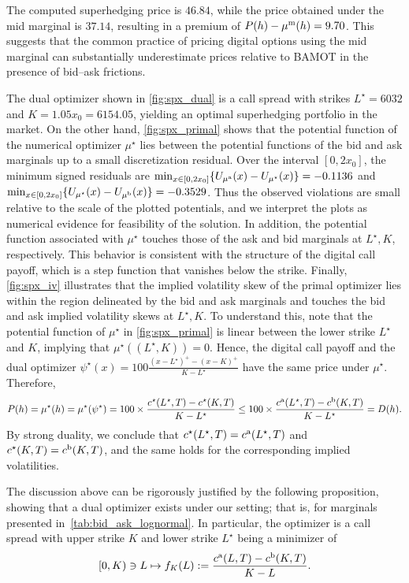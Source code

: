 \documentclass[11pt]{article}
\theoremstyle{plain}
\theoremstyle{definition}
\theoremstyle{remark}
\theoremstyle{plain}
\begin{document}
The computed superhedging price is $46.84$, while the price obtained under the mid marginal is $37.14$, resulting in a premium of $P(h)-\mu^{\rm m}(h)=9.70$. This suggests that the common practice of pricing digital options using the mid marginal can substantially underestimate prices relative to BAMOT in the presence of bid--ask frictions. 


The dual optimizer shown in \cref{fig:spx_dual} is a call spread with strikes $L^\star= 6032$ and $K = 1.05 x_0 = 6154.05$, yielding an optimal superhedging portfolio in the market. 
%
On the other hand, \cref{fig:spx_primal} shows that the potential function of the numerical optimizer $\mu^\star$ lies between the potential functions of the bid and ask marginals up to a small discretization residual. Over the interval $[0,2x_0]$, the minimum signed residuals are $\min_{x\in[0,2x_0]}
\{U_{\mu^{\rm a}}(x)-U_{\mu^\star}(x)\}
= -0.1136$ and $\min_{x\in[0,2x_0]}
\{U_{\mu^\star}(x)-U_{\mu^{\rm b}}(x)\}
= -0.3529$.
Thus the observed violations are small relative to the scale of the plotted potentials, and we interpret the plots as numerical evidence for feasibility of the solution.
In addition, the potential function associated with $\mu^{\star}$ touches those of the ask and bid marginals at $L^\star, K$, respectively. This behavior is consistent with the structure of the digital call payoff, which is a step function that vanishes below the strike. Finally, \cref{fig:spx_iv} illustrates that the implied volatility skew of the primal optimizer lies within the region delineated by the bid and ask marginals and touches the bid and ask implied volatility skews at $L^\star, K$.
To understand this, note that the potential function of $\mu^{\star}$ in \cref{fig:spx_primal} is linear between the lower strike $L^{\star}$ and $K$, implying that $\mu^{\star}((L^{\star},K))=0$. Hence, the digital call payoff and the dual optimizer $\psi^{\star}(x)=100\frac{(x-L^{\star})^+-(x-K)^+}{K-L^{\star}}$ have the same price under $\mu^{\star}$. Therefore,
\[
P(h)=\mu^{\star}(h)=\mu^{\star}(\psi^{\star})
=100\times\frac{c^{\star}(L^{\star},T)-c^{\star}(K,T)}{K-L^{\star}}
\le 100\times\frac{c^{\rm a}(L^{\star},T)-c^{\rm b}(K,T)}{K-L^{\star}}
= D(h).
\]
By strong duality, we conclude that $c^{\star}(L^{\star},T)=c^{\rm a}(L^{\star},T)$ and $c^{\star}(K,T)=c^{\rm b}(K,T)$, and the same holds for the corresponding implied volatilities.



%
%
The discussion above can be rigorously justified by the following proposition, showing that a dual optimizer exists under our setting; that is, for marginals presented in~\cref{tab:bid_ask_lognormal}. In particular, the optimizer is a call spread with upper strike $K$ and lower strike $L^\star$ being a minimizer of
\[
[0,K) \ni L\mapsto f_K(L):=\frac{c^{\rm a}(L,T)-c^{\rm b}(K,T)}{K-L}.
\]
\end{document}
